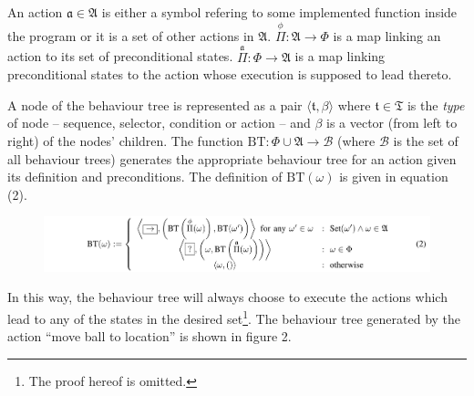 An action \(\mathfrak{a}\in\mathfrak{A}\) is either a symbol refering to some implemented function inside the program or it is a set of other actions in \(\mathfrak{A}\). \(\overset{\phi}\Pi : \mathfrak{A} \to \Phi\) is a map linking an action to its set of preconditional states. \(\overset{\mathfrak{a}}\Pi : \Phi \to \mathfrak{A}\) is a map linking preconditional states to the action whose execution is supposed to lead thereto.

A node of the behaviour tree is represented as a pair \(\langle \mathfrak{t}, \beta \rangle\) where \(\mathfrak{t}\in\mathfrak{T}\) is the \textit{type} of node -- sequence, selector, condition or action -- and \(\beta\) is a vector (from left to right) of the nodes' children. The function \(\text{BT}:\Phi\cup\mathfrak{A} \to \mathscr{B}\) (where \(\mathscr{B}\) is the set of all behaviour trees) generates the appropriate behaviour tree for an action given its definition and preconditions. The definition of \(\text{BT}(\omega)\) is given in equation (2).

\begin{figure}[h!]
	\centering
    \includegraphics[width=\textwidth]{equation2.png}
    \label{fig:fullbredd}
\end{figure}

In this way, the behaviour tree will always choose to execute the actions which lead to any of the states in the desired set\footnote{The proof hereof is omitted.}. The behaviour tree generated by the action ``move ball to location'' is shown in figure 2.

